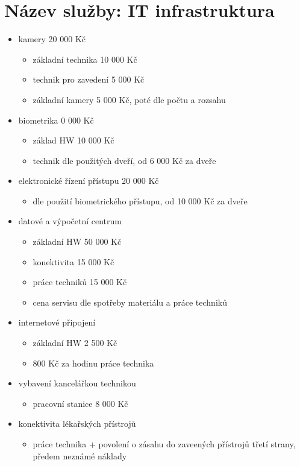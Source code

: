 \documentclass[11pt, a4paper, titlepage]{article}
\begin{document}
	\section*{Název služby: IT infrastruktura}
	\begin{itemize}
		\item kamery 20 000 Kč
		\begin{itemize}
			\item základní technika 10 000 Kč
			\item technik pro zavedení 5 000 Kč
			\item základní kamery 5 000 Kč, poté dle počtu a rozsahu
		\end{itemize}
		\item biometrika 0 000 Kč
		\begin{itemize}
			\item základ HW 10 000 Kč
			\item technik dle použitých dveří, od 6 000 Kč za dveře
		\end{itemize}
		\item elektronické řízení přístupu 20 000 Kč
		\begin{itemize}
			\item dle použití biometrického přístupu, od 10 000 Kč za dveře
		\end{itemize}

		\item datové a výpočetní centrum
		\begin{itemize}
			\item základní HW 50 000 Kč
			\item konektivita 15 000 Kč
			\item práce techniků 15 000 Kč
			\item cena servisu dle spotřeby materiálu a práce techniků
		\end{itemize}

		\item internetové připojení
		\begin{itemize}
			\item základní HW 2 500 Kč
			\item 800 Kč za hodinu práce technika
		\end{itemize}

		\item vybavení kancelářkou technikou
		\begin{itemize}
			\item pracovní stanice 8 000 Kč
		\end{itemize}

		\item konektivita lékařských přístrojů
		\begin{itemize}
			\item práce technika + povolení o zásahu do zaveených přístrojů třetí strany, předem neznámé náklady
		\end{itemize}
	\end{itemize}
	
\end{document}
